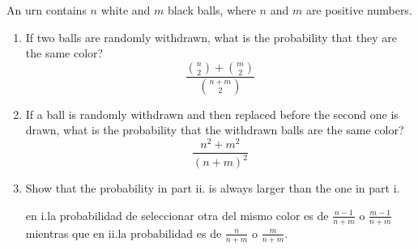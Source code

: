 \item An urn contains $n$ white and $m$ black balls, where $n$ and $m$ are positive numbers.
\begin{enumerate}
    \item If two balls are randomly withdrawn, what is the probability that they are the same color?
    \[ \frac{\binom{n}{2} + \binom{m}{2}}{\binom{n+m}{2}} \]
    
    \item If a ball is randomly withdrawn and then replaced before the second one is drawn, what is the probability that the withdrawn balls are the same color?
    \[ \frac{n^2 + m^2}{(n+m)^2} \]
    
    \item Show that the probability in part ii. is always larger than the one in part i.

    en i.\@ la probabilidad de seleccionar otra del mismo color es de $\frac{n-1}{n+m}$ o $\frac{m-1}{n+m}$ mientras que en ii.\@ la probabilidad es de $\frac{n}{n+m}$ o $\frac{m}{n+m}$.
\end{enumerate}